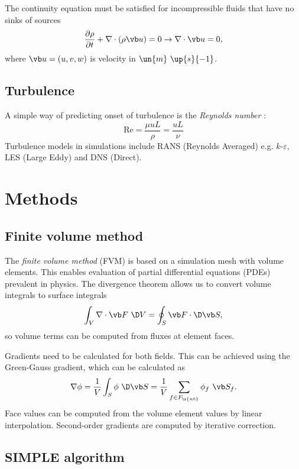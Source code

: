 \documentclass[12pt]{article}
\newcommand{\fnb}{F_{\x{nb}}}
\begin{document}
The continuity equation must be satisfied for incompressible fluids that have no sinks of sources
\begin{equation}
  \frac{\partial \rho}{\partial t} + \nabla \cdot (\rho \vb u) = 0 \rightarrow \nabla \cdot \vb u = 0,
\end{equation}
where $\vb u = (u, v, w)$ is velocity in $\un{m} \ \up{s}{-1}$.

\subsection{Turbulence}

A simple way of predicting onset of turbulence is the \textit{Reynolds number} \cite{tri}:
$$
\text{Re} = \frac{\mu u L}{\rho} = \frac{u L}{\nu}
$$
Turbulence models in simulations include RANS (Reynolds Averaged) e.g. $k$-$\varepsilon$, LES (Large Eddy) and DNS (Direct).

\section{Methods}


\subsection{Finite volume method}

The \textit{finite volume method} (FVM) is based on a simulation mesh with volume elements. This enables evaluation of partial differential equations (PDEs) prevalent in physics. The divergence theorem allows us to convert volume integrals to surface integrals
$$
\int_V \nabla \cdot \vb F \ \D V = \oint_S \vb F \cdot \D \vb S,
$$
so volume terms can be computed from fluxes at element faces.

Gradients need to be calculated for both fields. This can be achieved using the Green-Gauss gradient, which can be calculated as
$$
\nabla \phi = \frac{1}{V} \int_S \phi \ \D \vb S = \frac{1}{V} \sum_{f \in \fnb} \phi_f \ \vb S_f.
$$
Face values can be computed from the volume element values by linear interpolation. Second-order gradients are computed by iterative correction.

\subsection{SIMPLE algorithm}
\end{document}
